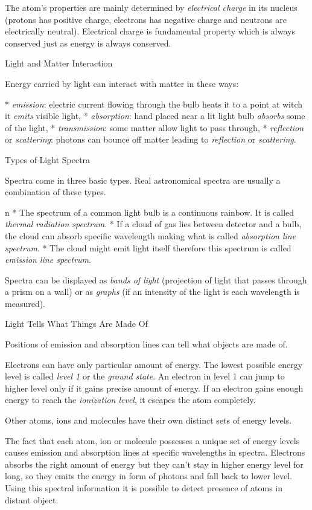 The atom's properties are mainly determined by {\em electrical charge} in its
nucleus (protons has positive charge, electrons has negative charge
and neutrons are electrically neutral). Electrical charge is fundamental
property which is always conserved just as energy is always conserved.

\sec Light and Matter Interaction

Energy carried by light can interact with matter in these ways:

\begitems
* {\em emission}: electric current flowing through the bulb heats it to a point
at witch it {\em emits} visible light,
* {\em absorption}: hand placed near a lit light bulb {\em absorbs} some
of the light,
* {\em transmission}: some matter allow light to pass through,
* {\em reflection} or {\em scattering}: photons can bounce off matter leading to
{\em reflection} or {\em scattering}.
\enditems

\sec Types of Light Spectra

Spectra come in three basic types. Real astronomical spectra are usually
a combination of these types.

\begitems \style n
* The spectrum of a common light bulb is a continuous rainbow. It is called
{\em thermal radiation spectrum}.
* If a cloud of gas lies between detector and a bulb, the cloud can absorb
specific wavelength making what is called {\em absorption line spectrum}.
* The cloud might emit light itself therefore this spectrum is called
{\em emission line spectrum}.
\enditems

Spectra can be displayed as {\em bands of light} (projection of light that
passes through a prism on a wall) or as {\em graphs} (if an intensity
of the light is each wavelength is measured).

\sec Light Tells What Things Are Made Of

Positions of emission and absorption lines can tell what objects are made of.

Electrons can have only particular amount of energy. The lowest possible energy
level is called {\em level 1} or the {\em ground state}. An electron in level 1
can jump to higher level only if it gains precise amount of energy. If
an electron gains enough energy to reach the {\em ionization level}, it escapes
the atom completely.

Other atoms, ions and molecules have their own distinct sets of energy levels.

The fact that each atom, ion or molecule possesses a unique set of energy levels
causes emission and absorption lines at specific wavelengths in spectra.
Electrons absorbs the right amount of energy but they can't stay in higher
energy level for long, so they emits the energy in form of photons and fall
back to lower level. Using this spectral information it is possible to detect
presence of atoms in distant object.

